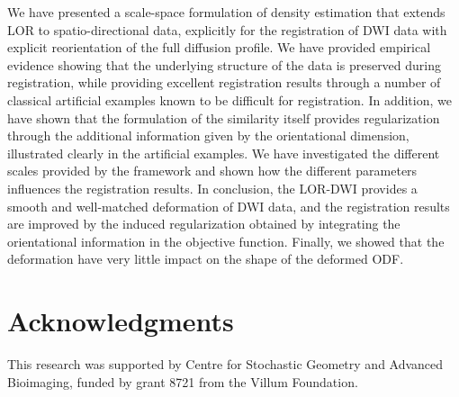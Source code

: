 \documentclass[twocolumn]{svjour3}
\begin{document}
We have presented a scale-space formulation of density estimation that extends LOR to
spatio-directional data, explicitly for the registration of DWI data with explicit
reorientation of the full diffusion profile. We have provided empirical evidence showing
that the underlying structure of the data is preserved during registration, while
providing excellent registration results through a number of classical artificial examples
known to be difficult for registration. In addition, we have shown that the formulation of
the similarity itself provides regularization through the additional information given by
the orientational dimension, illustrated clearly in the artificial examples. We have
investigated the different scales provided by the framework and shown how the different
parameters influences the registration results. In conclusion, the LOR-DWI provides a
smooth and well-matched deformation of DWI data, and the registration results are improved
by the induced regularization obtained by integrating the orientational information in the
objective function. Finally, we showed that the deformation have very little impact on the
shape of the deformed ODF.

\section*{Acknowledgments}
This research was supported by Centre for Stochastic Geometry and 
Advanced Bioimaging, funded by grant 8721 from the Villum Foundation.




\vspace{-1cm}
\end{document}
